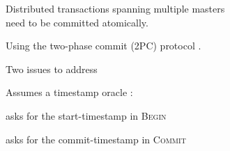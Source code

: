 \begin{frame}{}
  \begin{center}
    \begin{minipage}{1.0\textwidth}
      
    \end{minipage}
  \end{center}
\end{frame}

\begin{frame}{}
  \begin{center}
  \end{center}
\end{frame}

\begin{frame}{}
  \begin{center}
    \begin{minipage}{1.0\textwidth}
      
    \end{minipage}
  \end{center}
\end{frame}

\begin{frame}{}
  \begin{center}
    Distributed transactions spanning multiple masters \\
    need to be committed atomically.

    \pause
    \vspace{0.40cm}
    Using the two-phase commit (2PC) protocol .

    \pause
    \vspace{1.00cm}
    Two issues to address
  \end{center}
\end{frame}

\begin{frame}{}
  Assumes a timestamp oracle :
  \begin{description}[Coordinator:]
    \item[Client:] asks for the start-timestamp in \textsc{Begin}
    \item[Coordinator:] asks for the commit-timestamp in \textsc{Commit}
  \end{description}
\end{frame}

